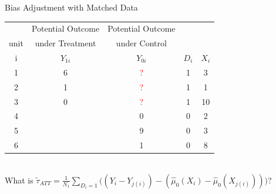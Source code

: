 \documentclass[xcolor=dvipsnames]{beamer}
\begin{document}
\begin{frame}{Bias Adjustment with Matched Data}
\begin{centering}
\begin{tabular}{c|c|c|c|c}
 &Potential Outcome & Potential Outcome &   & \\
unit &under Treatment  & under Control &   &  \\

\hline
   i  & $Y_{1i}$  & $Y_{0i}$ &    $D_i$ &  $X_i$ \\
\hline
         1 & \multicolumn{ 1}{c|}{6} & \multicolumn{ 1}{c|}{\textcolor{red}{?}} &                    1 &          3 \\
         2 & \multicolumn{ 1}{c|}{1} & \multicolumn{ 1}{c|}{\textcolor{red}{?}} &                    1 &          1 \\
         3 & \multicolumn{ 1}{c|}{0} & \multicolumn{ 1}{c|}{\textcolor{red}{?}} &                    1 &          10 \\
\hline
         4 & \multicolumn{ 1}{c|}{} & \multicolumn{1}{c|}{0} &                    0 &          2 \\
         5 & \multicolumn{ 1}{c|}{} & \multicolumn{1}{c|}{9} &                    0 &          3 \\
         6 & \multicolumn{ 1}{c|}{} & \multicolumn{1}{c|}{1} &                    0 &          8 \\
         \hline
\end{tabular}
\end{centering} \\
\bigskip
What is
$\tilde\tau_{ATT}= \frac{1}{N_1}\sum_{D_i=1} \Big((Y_i-Y_{j(i)})- (\widehat\mu_0(X_i)-\widehat\mu_0(X_{j(i)})) \Big)$?

\end{frame}
\end{document}

